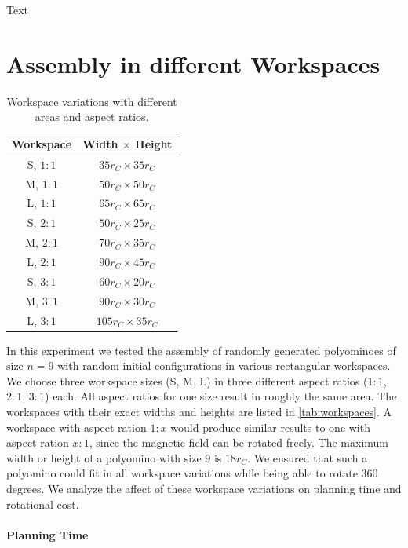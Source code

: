 Text




\section{Assembly in different Workspaces}
\label{sec:AFBS}

\begin{table}
	\centering
	\begin{tabular}{|c|c|}
		\hline
		\textbf{Workspace} & \textbf{Width $\times$ Height}\\
		\hline
		S, $ 1:1 $ & $35 r_C \times 35 r_C$\\
		\hline
		M, $ 1:1 $ & $50 r_C \times 50 r_C$ \\
		\hline
		L, $ 1:1 $ & $65 r_C \times 65 r_C$ \\
		\hline
		S, $ 2:1 $ & $50 r_C \times 25 r_C$\\
		\hline
		M, $ 2:1 $ & $70 r_C \times 35 r_C$ \\
		\hline
		L, $ 2:1 $ & $90 r_C \times 45 r_C$ \\
		\hline
		S, $ 3:1 $ & $60 r_C \times 20 r_C$\\
		\hline
		M, $ 3:1 $ & $90 r_C \times 30 r_C$ \\
		\hline
		L, $ 3:1 $ & $105 r_C \times 35 r_C$ \\
		\hline
	\end{tabular}
	\caption{Workspace variations with different areas and aspect ratios.}
	\label{tab:workspaces}
\end{table}

In this experiment we tested the assembly of randomly generated polyominoes of size $n=9$ with random initial configurations in various rectangular workspaces.
We choose three workspace sizes (S, M, L) in three different aspect ratios ($ 1:1 $, $ 2:1 $, $ 3:1 $) each.
All aspect ratios for one size result in roughly the same area. The workspaces with their exact widths and heights are listed in \autoref{tab:workspaces}.
A workspace with aspect ration $ 1:x $ would produce similar results to one with aspect ration $ x:1 $, since the magnetic field can be rotated freely.
The maximum width or height of a polyomino with size $9$ is $18 r_C$.
We ensured that such a polyomino could fit in all workspace variations while being able to rotate 360 degrees.
We analyze the affect of these workspace variations on planning time and rotational cost.

\paragraph{Planning Time} 

